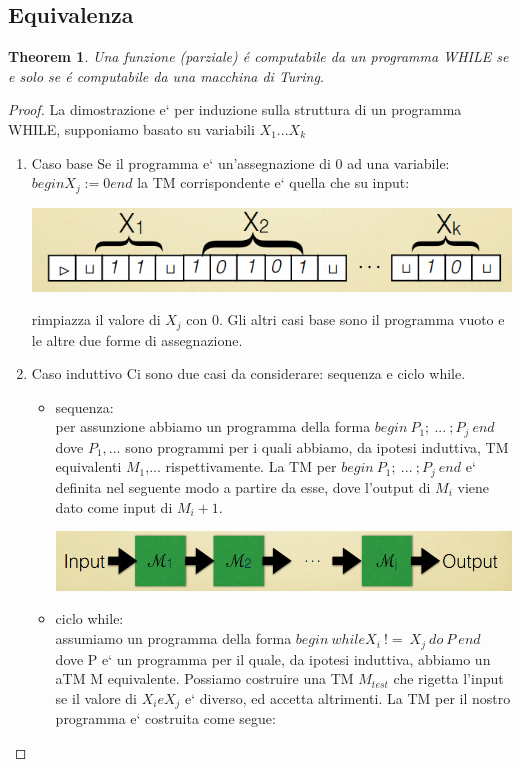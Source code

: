 \documentclass[a4paper, 12pt]{article}
\newtheorem{theorem}{Theorem}[section]
\begin{document}
\subsection{Equivalenza}
\begin{theorem}
Una funzione (parziale) é computabile da un programma WHILE se e solo se é computabile da una macchina di Turing.
\end{theorem}
\begin{proof}
La dimostrazione e` per induzione sulla struttura di un programma WHILE, supponiamo basato su variabili \(X_1...X_k\)
\begin{enumerate}
\item Caso base
	Se il programma e` un'assegnazione di 0 ad una variabile:
	\(begin X_j := 0 end\) la TM corrispondente e` quella che su input:
	\begin{center}
	\includegraphics[scale=0.5]{while1.png}
	\end{center}
	rimpiazza il valore di \(X_j\) con 0.
	Gli altri casi base sono il programma vuoto e le altre due forme di assegnazione.
\item Caso induttivo
	Ci sono due casi da considerare: sequenza e ciclo while.
	\begin{itemize}
	\item sequenza:\\
		per assunzione abbiamo un programma della forma \(begin\ P_1;\ ...\ ;P_j\ end\)
		dove \(P_1,...\) sono programmi per i quali abbiamo, da ipotesi induttiva, TM equivalenti $M_1$,... rispettivamente. La TM per \( begin\ P_1;\ ...\ ;P_j\ end\) e` definita nel seguente modo a partire da esse, dove l'output di $M_i$ viene dato come input di $M_i+1$.
		\begin{center}
	\includegraphics[scale=0.4]{while2.png}
	\end{center}
	\item ciclo while:\\
	assumiamo un programma della forma \(begin\ while X_{i}\ !=\ X_j\ do\ P\ end\) dove P e` un programma per il quale, da ipotesi induttiva, abbiamo un aTM M  equivalente. Possiamo costruire una TM \(M_{test}\) che rigetta l'input se il valore di \(X_{i} e X_{j}\) e` diverso, ed accetta altrimenti. La TM per il nostro programma e` costruita come segue: 
	

\end{itemize}
\end{enumerate}
\end{proof}
\end{document}
